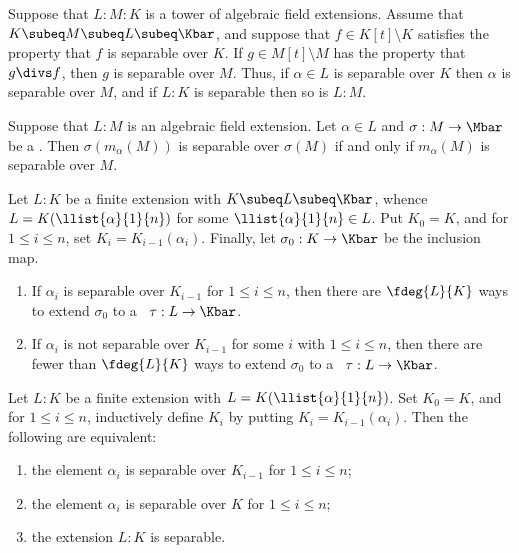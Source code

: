 \documentclass{article}
\begin{document}
  \begin{tproposition}
    Suppose that \( L:M:K \) is a tower of algebraic field extensions.
    Assume that \( K\subeq M\subeq L\subeq \Kbar \), and suppose that \( f\in K[t]\setminus K \) satisfies the property that \( f \) is separable over \( K \).
    If \( g\in M[t]\setminus M \) has the property that \( g\divs f \), then \( g \) is separable over \( M \).
    Thus, if \( \alpha\in L \) is separable over \( K \) then \( \alpha \) is separable over \( M \), and if \( L:K \) is separable then so is \( L:M \).
  \end{tproposition}

  \begin{tproposition}
    Suppose that \( L:M \) is an algebraic field extension.
    Let \( \alpha\in L \) and \( \sigma:M\to\Mbar \) be a \homo.
    Then \( \sigma(m_\alpha(M)) \) is separable over \( \sigma(M) \) if and only if \( m_\alpha(M) \) is separable over \( M \).
  \end{tproposition}

  \begin{ttheorem}
    Let \( L:K \) be a finite extension with \( K\subeq L\subeq \Kbar \), whence \( L=K(\llist{\alpha}{1}{n}) \) for some \( \llist{\alpha}{1}{n}\in L \).
    Put \( K_0=K \), and for \( 1\leq i\leq n \), set \( K_i=K_{i-1}(\alpha_i) \).
    Finally, let \( \sigma_0:K\to\Kbar \) be the inclusion map.
    \begin{enumerate}[label=(\roman*)]
      \item If \( \alpha_i \) is separable over \( K_{i-1} \) for \( 1\leq i\leq n \), then there are \( \fdeg{L}{K} \) ways to extend \( \sigma_0 \) to a \homo~\( \tau:L\to \Kbar \).
      \item If \( \alpha_i \) is not separable over \( K_{i-1} \) for some \( i \) with \( 1\leq i\leq n \), then there are fewer than \( \fdeg{L}{K} \) ways to extend \( \sigma_0 \) to a \homo~\( \tau:L\to \Kbar \).
    \end{enumerate}
  \end{ttheorem}

  \begin{ttheorem}
    Let \( L:K \) be a finite extension with \( L=K(\llist{\alpha}{1}{n}) \).
    Set \( K_0=K \), and for \( 1\leq i\leq n \), inductively define \( K_i \) by putting \( K_i=K_{i-1}(\alpha_i) \).
    Then the following are equivalent: \begin{enumerate}[label=(\roman*)]
      \item the element \( \alpha_i \) is separable over \( K_{i-1} \) for \( 1\leq i\leq n \);
      \item the element \( \alpha_i \) is separable over \( K \) for \( 1\leq i\leq n \);
      \item the extension \( L:K \) is separable.
    \end{enumerate}
  \end{ttheorem}
\end{document}

